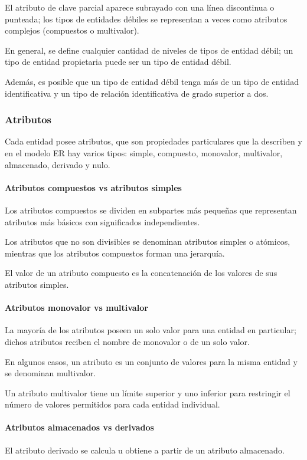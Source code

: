 El atributo de clave parcial aparece subrayado con una línea discontinua o punteada; los tipos de entidades débiles se representan a veces como atributos complejos (compuestos o multivalor). 


En general, se define cualquier cantidad de niveles de tipos de entidad débil; un tipo de entidad propietaria puede ser un tipo de entidad débil. 


Además, es posible que un tipo de entidad débil tenga más de un tipo de entidad identificativa y un tipo de relación identificativa de grado superior a dos.

\subsubsection{Atributos}
Cada entidad posee atributos, que son propiedades particulares que la describen y en el modelo ER hay varios tipos: simple, compuesto, monovalor, multivalor, almacenado, derivado y nulo.


\paragraph*{Atributos compuestos vs atributos simples} 


Los atributos compuestos se dividen en subpartes más pequeñas que representan atributos más básicos con significados independientes.


Los atributos que no son divisibles se denominan atributos simples o atómicos, mientras que los atributos compuestos forman una jerarquía. 


El valor de un atributo compuesto es la concatenación de los valores de sus atributos simples.

\paragraph*{Atributos monovalor vs multivalor}  


La mayoría de los atributos poseen un solo valor para una entidad en particular; dichos atributos reciben el nombre de monovalor o de un solo valor. 


En algunos casos, un atributo es un conjunto de valores para la misma entidad y se denominan multivalor.


Un atributo multivalor tiene un límite superior y uno inferior para restringir el número de valores permitidos para cada entidad individual.


\paragraph*{Atributos almacenados vs derivados}
El atributo derivado se calcula u obtiene a partir de un atributo almacenado.


